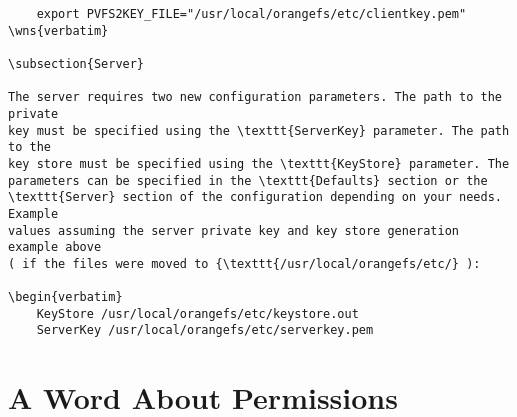 \documentclass[11pt, letterpaper]{article}
\begin{document}
\begin{verbatim}
    export PVFS2KEY_FILE="/usr/local/orangefs/etc/clientkey.pem"
\wns{verbatim}

\subsection{Server}

The server requires two new configuration parameters. The path to the private 
key must be specified using the \texttt{ServerKey} parameter. The path to the 
key store must be specified using the \texttt{KeyStore} parameter. The 
parameters can be specified in the \texttt{Defaults} section or the 
\texttt{Server} section of the configuration depending on your needs. Example 
values assuming the server private key and key store generation example above 
( if the files were moved to {\texttt{/usr/local/orangefs/etc/} ):

\begin{verbatim}
    KeyStore /usr/local/orangefs/etc/keystore.out
    ServerKey /usr/local/orangefs/etc/serverkey.pem
\end{verbatim}

\section{A Word About Permissions}
\end{document}
